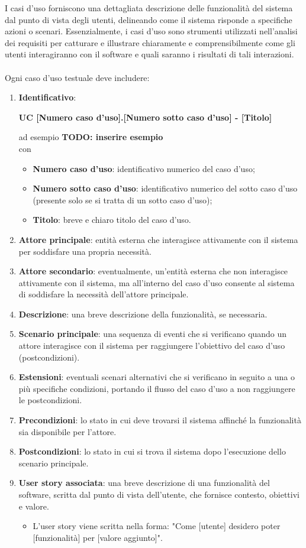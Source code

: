 I casi d'uso forniscono una dettagliata descrizione delle funzionalità del sistema dal punto di vista degli utenti, delineando come il sistema risponde a specifiche azioni o scenari.
Essenzialmente, i casi d'uso sono strumenti utilizzati nell'analisi dei requisiti per catturare e illustrare chiaramente e comprensibilmente come gli utenti interagiranno con il software e quali saranno i risultati di tali interazioni. \\
\\
Ogni caso d'uso testuale deve includere:
\begin{enumerate}
	\item \textbf{Identificativo}: \begin{center}\textbf{UC [Numero caso d'uso].[Numero sotto caso d'uso] - [Titolo]}\end{center} ad esempio \textbf{TODO: inserire esempio} \\ con
	\begin{itemize}
		\item \textbf{Numero caso d'uso}: identificativo numerico del caso d'uso;
		\item \textbf{Numero sotto caso d'uso}: identificativo numerico del sotto caso d'uso (presente solo se si tratta di un sotto caso d'uso);
		\item \textbf{Titolo}: breve e chiaro titolo del caso d'uso.
	\end{itemize}
	\item \textbf{Attore principale}: entità esterna che interagisce attivamente con il sistema per soddisfare una propria necessità.
	\item \textbf{Attore secondario}: eventualmente, un'entità esterna che non interagisce attivamente con il sistema, ma all'interno del caso d'uso consente al sistema di soddisfare la necessità dell'attore principale.
	\item \textbf{Descrizione}: una breve descrizione della funzionalità, se necessaria.
	\item \textbf{Scenario principale}: una sequenza di eventi che si verificano quando un attore interagisce con il sistema per raggiungere l'obiettivo del caso d'uso (postcondizioni).
	\item \textbf{Estensioni}: eventuali scenari alternativi che si verificano in seguito a una o più specifiche condizioni, portando il flusso del caso d'uso a non raggiungere le postcondizioni.
	\item \textbf{Precondizioni}: lo stato in cui deve trovarsi il sistema affinché la funzionalità sia disponibile per l'attore.
	\item \textbf{Postcondizioni}: lo stato in cui si trova il sistema dopo l'esecuzione dello scenario principale.
	\item \textbf{User story associata}: una breve descrizione di una funzionalità del software, scritta dal punto di vista dell'utente, che fornisce contesto, obiettivi e valore.
	\begin{itemize}
		\item L'user story viene scritta nella forma: "Come [utente] desidero poter [funzionalità] per [valore aggiunto]".
	\end{itemize}
\end{enumerate}

